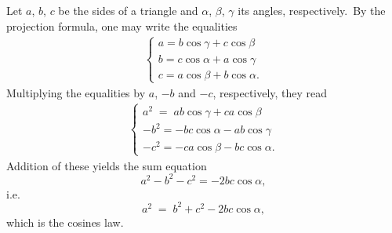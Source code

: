 \documentclass[12pt]{article}
\theoremstyle{definition}
\begin{document}
Let $a$, $b$, $c$ be the sides of a triangle and $\alpha$, $\beta$, $\gamma$ its angles, respectively.\, By the projection formula, one may write the equalities
\begin{align*}
\begin{cases}
a = b\cos\gamma+c\cos\beta\\
b = c\cos\alpha+a\cos\gamma\\
c = a\cos\beta+b\cos\alpha.
\end{cases}
\end{align*}
Multiplying the equalities by $a$, $-b$ and $-c$, respectively, they read
\begin{align*}
\begin{cases}
a^2 \;=\; ab\cos\gamma+ca\cos\beta\\
-b^2 = -bc\cos\alpha-ab\cos\gamma\\
-c^2 = -ca\cos\beta -bc\cos\alpha.
\end{cases}
\end{align*}
Addition of these yields the sum equation
$$a^2-b^2-c^2 = -2bc\cos\alpha,$$
i.e. 
$$a^2 \;=\; b^2+c^2-2bc\cos\alpha,$$
which is the cosines law.

\end{document}
